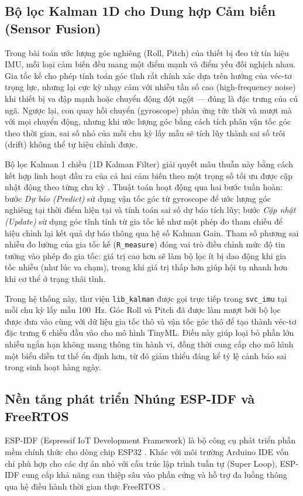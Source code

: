 \documentclass[../DoAn.tex]{subfiles}
\begin{document}
\subsection{Bộ lọc Kalman 1D cho Dung hợp Cảm biến (Sensor Fusion)}
\label{subsection:3.4.1}

Trong bài toán ước lượng góc nghiêng (Roll, Pitch) của thiết bị đeo từ tín hiệu IMU, mỗi loại cảm biến đều mang một điểm mạnh và điểm yếu đối nghịch nhau. Gia tốc kế cho phép tính toán góc tĩnh rất chính xác dựa trên hướng của véc-tơ trọng lực, nhưng lại cực kỳ nhạy cảm với nhiễu tần số cao (high-frequency noise) khi thiết bị va đập mạnh hoặc chuyển động đột ngột --- đúng là đặc trưng của cú ngã. Ngược lại, con quay hồi chuyển (gyroscope) phản ứng tức thời và mượt mà với mọi chuyển động, nhưng khi ước lượng góc bằng cách tích phân vận tốc góc theo thời gian, sai số nhỏ của mỗi chu kỳ lấy mẫu sẽ tích lũy thành sai số trôi (drift) không thể tự hiệu chỉnh được.

Bộ lọc Kalman 1 chiều (1D Kalman Filter) giải quyết mâu thuẫn này bằng cách kết hợp linh hoạt đầu ra của cả hai cảm biến theo một trọng số tối ưu được cập nhật động theo từng chu kỳ \cite{kalman1960new}. Thuật toán hoạt động qua hai bước tuần hoàn: bước \textit{Dự báo (Predict)} sử dụng vận tốc góc từ gyroscope để ước lượng góc nghiêng tại thời điểm hiện tại và tính toán sai số dự báo tích lũy; bước \textit{Cập nhật (Update)} sử dụng góc tĩnh tính từ gia tốc kế như một phép đo tham chiếu để hiệu chỉnh lại kết quả dự báo thông qua hệ số Kalman Gain. Tham số phương sai nhiễu đo lường của gia tốc kế (\texttt{R\_measure}) đóng vai trò điều chỉnh mức độ tin tưởng vào phép đo gia tốc: giá trị cao hơn sẽ làm bộ lọc ít bị dao động khi gia tốc nhiễu (như lúc va chạm), trong khi giá trị thấp hơn giúp hội tụ nhanh hơn khi cơ thể ở trạng thái tĩnh.

Trong hệ thống này, thư viện \texttt{lib\_kalman} được gọi trực tiếp trong \texttt{svc\_imu} tại mỗi chu kỳ lấy mẫu 100~Hz. Góc Roll và Pitch đã được làm mượt bởi bộ lọc được đưa vào cùng với dữ liệu gia tốc thô và vận tốc góc thô để tạo thành véc-tơ đặc trưng 6 chiều đầu vào cho mô hình TinyML. Điều này giúp loại bỏ phần lớn nhiễu ngắn hạn không mang thông tin hành vi, đồng thời cung cấp cho mô hình một biểu diễn tư thế ổn định hơn, từ đó giảm thiểu đáng kể tỷ lệ cảnh báo sai trong sinh hoạt hàng ngày.

\subsection{Nền tảng phát triển Nhúng ESP-IDF và FreeRTOS}
ESP-IDF (Espressif IoT Development Framework) là bộ công cụ phát triển phần mềm chính thức cho dòng chip ESP32 \cite{espressif2023espidf}. Khác với môi trường Arduino IDE vốn chỉ phù hợp cho các dự án nhỏ với cấu trúc lập trình tuần tự (Super Loop), ESP-IDF cung cấp khả năng can thiệp sâu vào phần cứng và hỗ trợ đa luồng thông qua hệ điều hành thời gian thực FreeRTOS \cite{freertos2023manual}.
\end{document}

